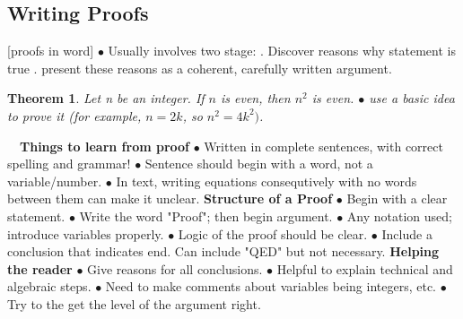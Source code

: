 \documentclass{article}
\newtheorem{theorem}{Theorem}                                       %
\begin{document}
\subsection{Writing Proofs}
[proofs in word]
$\bullet$ Usually involves two stage:
. Discover reasons why statement is true
. present these reasons as a coherent, carefully written argument.
\begin{theorem}
  Let n be an integer. If $n$ is even, then $n^2$ is even.
  \newline
    $\bullet$ use a basic idea to prove it (for example, $n = 2k$, so $n^2 = 4k^2)$.
\end{theorem}
$\text{ }$
\newline
\textbf{Things to learn from proof}
\newline
$\bullet$ Written in complete sentences, with correct spelling and grammar!
\newline
$\bullet$ Sentence should begin with a word, not a variable/number.
\newline
$\bullet$ In text, writing equations consequtively with no words between them can make it unclear.
\newline
\newline
{}
\newline
\newline
{}
\newline
\newline
\textbf{Structure of a Proof}
\newline
$\bullet$ Begin with a clear statement.
\newline
$\bullet$ Write the word "Proof"; then begin argument.
\newline
$\bullet$ Any notation used; introduce variables properly.
\newline
$\bullet$ Logic of the proof should be clear.
\newline
$\bullet$ Include a conclusion that indicates end. Can include "QED" but not necessary.  
\newline
\newline
\textbf{Helping the reader}
\newline
$\bullet$ Give reasons for all conclusions. 
\newline
$\bullet$ Helpful to explain technical and algebraic steps. 
\newline
$\bullet$ Need to make comments about variables being integers, etc.
\newline
$\bullet$ Try to the get the level of the argument right.
\newpage
\end{document}

